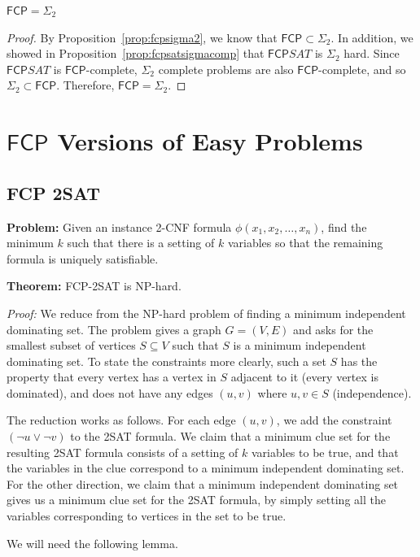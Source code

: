 \documentclass[runningheads,a4paper]{llncs}
\begin{document}
\begin{theorem}
$\mathsf{FCP} = \Sigma_2$
\end{theorem}

\begin{proof}
By Proposition~\ref{prop:fcpsigma2}, we know that $\mathsf{FCP} \subset \Sigma_2$. In addition, we showed in Proposition~\ref{prop:fcpsatsigmacomp} that $\mathsf{FCP} SAT$ is $\Sigma_2$ hard. Since $\mathsf{FCP} SAT$ is $\mathsf{FCP}$-complete, $\Sigma_2$ complete problems are also $\mathsf{FCP}$-complete, and so $\Sigma_2 \subset \mathsf{FCP}$. Therefore, $\mathsf{FCP} = \Sigma_2$. 
\end{proof}

\section{$\mathsf{FCP}$ Versions of Easy Problems}

\subsection{FCP 2SAT} 

\textbf{Problem:} Given an instance 2-CNF formula $\phi(x_1,x_2,\dots,x_n)$, find the minimum $k$ such that there is a setting of $k$ variables so that the remaining formula is uniquely satisfiable.

\textbf{Theorem:} FCP-2SAT is NP-hard.

\emph{Proof:} We reduce from the NP-hard problem of finding a minimum independent dominating set. The problem gives a graph $G = (V,E)$ and asks for the smallest subset of vertices $S \subseteq V$ such that $S$ is a minimum independent dominating set. To state the constraints more clearly, such a set $S$ has the property that every vertex has a vertex in $S$ adjacent to it (every vertex is dominated), and does not have any edges $(u,v)$ where $u,v \in S$ (independence).

The reduction works as follows. For each edge $(u,v)$, we add the constraint $(\neg u \vee \neg v)$ to the 2SAT formula. We claim that a minimum clue set for the resulting 2SAT formula consists of a setting of $k$ variables to be true, and that the variables in the clue correspond to a minimum independent dominating set. For the other direction, we claim that a minimum independent dominating set gives us a minimum clue set for the 2SAT formula, by simply setting all the variables corresponding to vertices in the set to be true.

We will need the following lemma.
\end{document}
